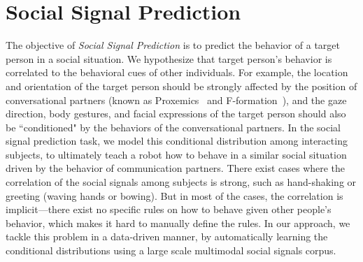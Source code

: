 
\section{Social Signal Prediction}
The objective of \emph{Social Signal Prediction} is to predict the behavior of a target person in a social situation. We hypothesize that target person's behavior is correlated to the behavioral cues of other individuals. For example, the location and orientation of the target person should be strongly affected by the position of conversational partners (known as Proxemics~\cite{Hall66} and F-formation~\cite{kendon90}), and the gaze direction, body gestures, and facial expressions of the target person should also be ``conditioned" by the behaviors of the conversational partners. In the social signal prediction task, we model this conditional distribution among interacting subjects, to ultimately teach a robot how to behave in a similar social situation driven by the behavior of communication partners. There exist cases where the correlation of the social signals among subjects is strong, such as hand-shaking or greeting (waving hands or bowing). But in most of the cases, the correlation is implicit---there exist no specific rules on how to behave given other people's behavior, which makes it hard to manually define the rules. In our approach, we tackle this problem in a data-driven manner, by automatically learning the conditional distributions using a large scale multimodal social signals corpus.  

